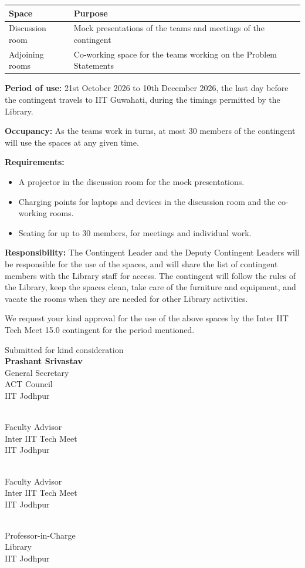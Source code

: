 \documentclass[11pt,letterpaper]{article}
\newcommand{\GSname}{Prashant Srivastav}
\newcommand{\FAIIname}{Dr. Bhivraj Suthar}
\newcommand{\FAIIbname}{Dr. Atul Kumar Sharma}
\newcommand{\PICname}{Dr. Kirankumar R. Hiremath}
\newcommand{\signature}[3]{%
  \begin{minipage}[t]{0.45\textwidth}\raggedright
  \vspace{1.2cm}{\bfseries #1}\\ #2\\ #3\\ IIT Jodhpur\end{minipage}}
\begin{document}
\begin{center}
\begin{tabular}{|L{4.2cm}|L{9.6cm}|}
\hline
\textbf{Space} & \textbf{Purpose} \\ \hline
Discussion room & Mock presentations of the teams and meetings of the contingent \\ \hline
Adjoining rooms & Co-working space for the teams working on the Problem Statements \\ \hline
\end{tabular}
\end{center}

\textbf{Period of use:} 21st October 2026 to 10th December 2026, the last day before the contingent travels to IIT Guwahati, during the timings permitted by the Library.

\textbf{Occupancy:} As the teams work in turns, at most 30 members of the contingent will use the spaces at any given time.

\textbf{Requirements:}
\begin{itemize}
  \item A projector in the discussion room for the mock presentations.
  \item Charging points for laptops and devices in the discussion room and the co-working rooms.
  \item Seating for up to 30 members, for meetings and individual work.
\end{itemize}

\textbf{Responsibility:} The Contingent Leader and the Deputy Contingent Leaders will be responsible for the use of the spaces, and will share the list of contingent members with the Library staff for access. The contingent will follow the rules of the Library, keep the spaces clean, take care of the furniture and equipment, and vacate the rooms when they are needed for other Library activities.

We request your kind approval for the use of the above spaces by the Inter IIT Tech Meet 15.0 contingent for the period mentioned.

\begin{flushright}
  {\small Submitted for kind consideration}\\[1.2cm]
  {\large\bfseries \GSname}\\
  General Secretary\\
  ACT Council\\
  IIT Jodhpur
\end{flushright}

\noindent\signature{\FAIIname}{Faculty Advisor}{Inter IIT Tech Meet}\hfill
\signature{\FAIIbname}{Faculty Advisor}{Inter IIT Tech Meet}\par
\noindent\signature{\PICname}{Professor-in-Charge}{Library}
\end{document}
